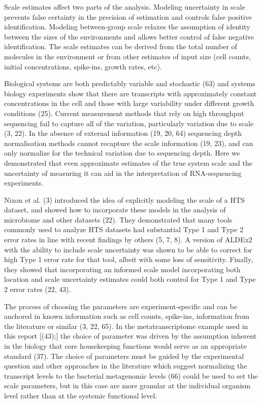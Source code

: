 \documentclass[
]{article}
\begin{document}
Scale estimates affect two parts of the analysis. Modeling uncertainty
in scale prevents false certainty in the precision of estimation and
controls false positive identification. Modeling between-group scale
relaxes the assumption of identity between the sizes of the environments
and allows better control of false negative identification. The scale
estimates can be derived from the total number of molecules in the
environment or from other estimates of input size (cell counts, initial
concentrations, spike-ins, growth rates, etc).

Biological systems are both predictably variable and stochastic (63) and
systems biology experiments show that there are transcripts with
approximately constant concentrations in the cell and those with large
variability under different growth conditions (25). Current measurement
methods that rely on high throughput sequencing fail to capture all of
the variation, particularly variation due to scale (3, 22). In the
absence of external information (19, 20, 64) sequencing depth
normalisation methods cannot recapture the scale information (19, 23),
and can only normalize for the technical variation due to sequencing
depth. Here we demonstrated that even approximate estimates of the true
system scale and the uncertainty of measuring it can aid in the
interpretation of RNA-sequencing experiments.

Nixon et al. (3) introduced the idea of explicitly modeling the scale of
a HTS dataset, and showed how to incorporate these models in the
analysis of microbiome and other datasets (22). They demonstrated that
many tools commonly used to analyze HTS datasets had substantial Type 1
and Type 2 error rates in line with recent findings by others (5, 7, 8).
A version of ALDEx2 with the ability to include scale uncertainty was
shown to be able to correct for high Type 1 error rate for that tool,
albeit with some loss of sensitivity. Finally, they showed that
incorporating an informed scale model incorporating both location and
scale uncertainty estimates could both control for Type 1 and Type 2
error rates (22, 43).

The process of choosing the parameters are experiment-specific and can
be anchored in known information such as cell counts, spike-ins,
information from the literature or similar (3, 22, 65). In the
metatranscriptome example used in this report {[}(43);{]} the choice of
parameter was driven by the assumption inherent in the biology that core
housekeeping functions would serve as an appropriate standard (37). The
choice of parameters must be guided by the experimental question and
other approaches in the literature which suggest normalizing the
transcript levels to the bacterial metagenomic levels (66) could be used
to set the scale parameters, but in this case are more granular at the
individual organism level rather than at the systemic functional level.
\end{document}
